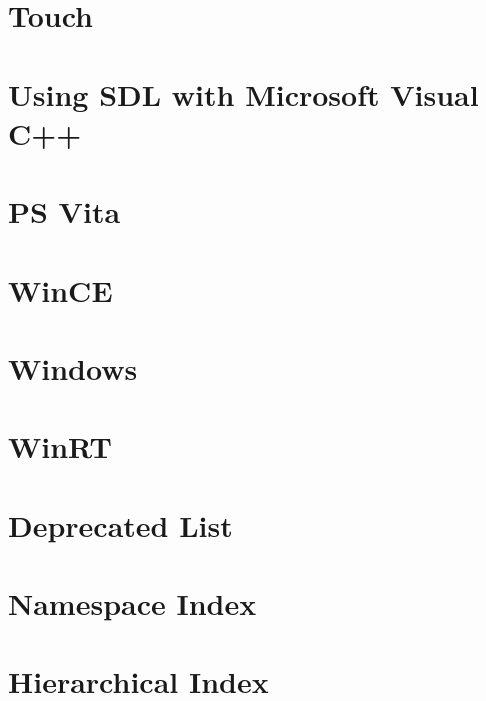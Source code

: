 \documentclass[twoside]{book}
\newcommand{\+}{\discretionary{\mbox{\scriptsize$\hookleftarrow$}}{}{}}
\begin{document}
\chapter{Touch}
\label{md__d___ray_tracing_docs__r_e_a_d_m_e_touch}

\chapter{Using SDL with Microsoft Visual C++}
\label{md__d___ray_tracing_docs__r_e_a_d_m_e_visualc}

\chapter{PS Vita}
\label{md__d___ray_tracing_docs__r_e_a_d_m_e_vita}

\chapter{Win\+CE}
\label{md__d___ray_tracing_docs__r_e_a_d_m_e_wince}

\chapter{Windows}
\label{md__d___ray_tracing_docs__r_e_a_d_m_e_windows}

\chapter{Win\+RT}
\label{md__d___ray_tracing_docs__r_e_a_d_m_e_winrt}

\chapter{Deprecated List}
\label{deprecated}

\chapter{Namespace Index}

\chapter{Hierarchical Index}

\end{document}
